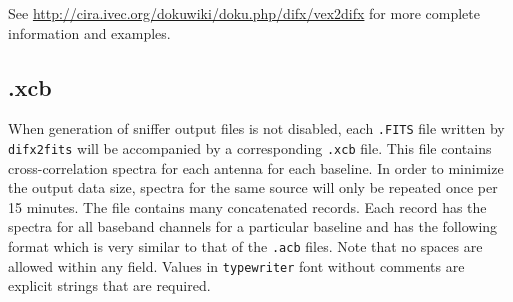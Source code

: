 See \url{http://cira.ivec.org/dokuwiki/doku.php/difx/vex2difx} for more complete information and examples.









\subsection{.xcb} \label{sec:xcb}

When generation of sniffer output files is not disabled, each {\tt .FITS} file written by {\tt difx2fits} will be accompanied by a corresponding {\tt .xcb} file. 
This file contains cross-correlation spectra for each antenna for each baseline.
In order to minimize the output data size, spectra for the same source will only be repeated once per 15 minutes.
The file contains many concatenated records.
Each record has the spectra for all baseband channels for a particular baseline and has the following format which is very similar to that of the {\tt .acb} files. 
Note that no spaces are allowed within any field.
Values in {\tt typewriter} font without comments are explicit strings that are required.

